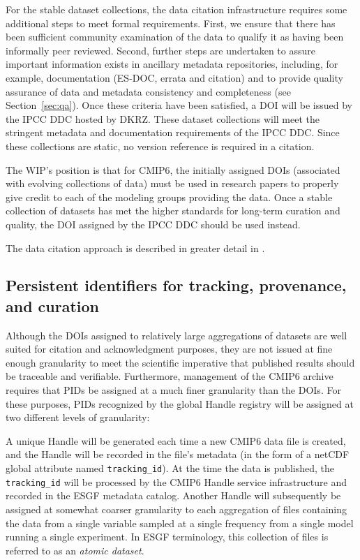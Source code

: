 \documentclass[gmd,manuscript]{copernicus}
\newcommand{\bibref}[1] { \cite{ref:#1}}
\newcommand{\secref}[1] {\mbox{Section  \ref{sec:#1}}}
\begin{document}
For the stable dataset collections, the data citation infrastructure
requires some additional steps to meet formal requirements. First, we
ensure that there has been sufficient community examination of the
data to qualify it as having been informally peer reviewed. Second,
further steps are undertaken to assure important information exists in
ancillary metadata repositories, including, for example, documentation
(ES-DOC, errata and citation) and to provide quality assurance of data
and metadata consistency and completeness (see \secref{qa}). Once
these criteria have been satisfied, a DOI will be issued by the IPCC
DDC hosted by DKRZ. These dataset collections will meet the stringent
metadata and documentation requirements of the IPCC DDC. Since these
collections are static, no version reference is required in a
citation.

The WIP's position is that for CMIP6, the initially assigned DOIs
(associated with evolving collections of data) must be used in
research papers to properly give credit to each of the modeling groups
providing the data. Once a stable collection of datasets has met the
higher standards for long-term curation and quality, the DOI assigned
by the IPCC DDC should be used instead.

The data citation approach is described in greater detail in \bibref{stockhauselautenschlager2017}.

\subsection{Persistent identifiers for tracking, provenance, and
  curation}
\label{sec:pid}

Although the DOIs assigned to relatively large aggregations of
datasets are well suited for citation and acknowledgment purposes,
they are not issued at fine enough granularity to meet the scientific
imperative that published results should be traceable and verifiable.
Furthermore, management of the CMIP6 archive requires that PIDs be
assigned at a much finer granularity than the DOIs. For these
purposes, PIDs recognized by the global Handle registry will be
assigned at two different levels of granularity:

A unique Handle will be generated each time a new CMIP6 data file is
created, and the Handle will be recorded in the file's metadata (in
the form of a netCDF global attribute named \texttt{tracking\_id}). At
the time the data is published, the \texttt{tracking\_id} will be
processed by the CMIP6 Handle service infrastructure and recorded in
the ESGF metadata catalog. Another Handle will subsequently be
assigned at somewhat coarser granularity to each aggregation of files
containing the data from a single variable sampled at a single
frequency from a single model running a single experiment. In ESGF
terminology, this collection of files is referred to as an
\emph{atomic dataset}.
\end{document}
